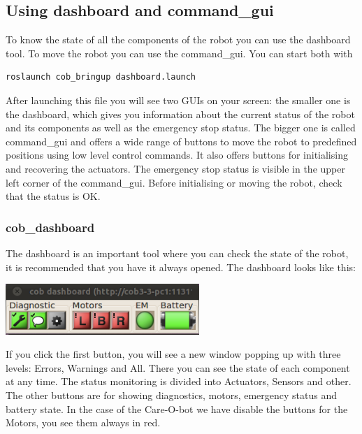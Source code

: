 \subsection{Using dashboard and command\_gui}
To know the state of all the components of the robot you can use the dashboard tool. To move the robot you can use the command\_gui. You can start both with
\begin{lstlisting}
roslaunch cob_bringup dashboard.launch
\end{lstlisting}

After launching this file you will see two GUIs on your screen: the smaller one is the dashboard, which gives you information about the current status of the robot and its components as well as the emergency stop status. The bigger one is called command\_gui and offers a wide range of buttons to move the robot to predefined positions using low level control commands. It also offers buttons for initialising and recovering the actuators. The emergency stop status is visible in the upper left corner of the command\_gui. Before initialising or moving the robot, check that the status is OK.

\subsubsection{cob\_dashboard}\label{subsec:dashboard}
The dashboard is an important tool where you can check the state of the robot, it is recommended that you have it always opened. The dashboard looks like this:

\begin{center}
\includegraphics[width=0.55\textwidth]{images/dashboard.png}
\end{center}
If you click the first button, you will see a new window popping up with three levels: Errors, Warnings and All. There you can see the state of each component at any time. The status monitoring is divided into Actuators, Sensors and other. The other buttons are for showing diagnostics, motors, emergency status and battery state. In the case of the Care-O-bot we have disable the buttons for the Motors, you see them always in red.

